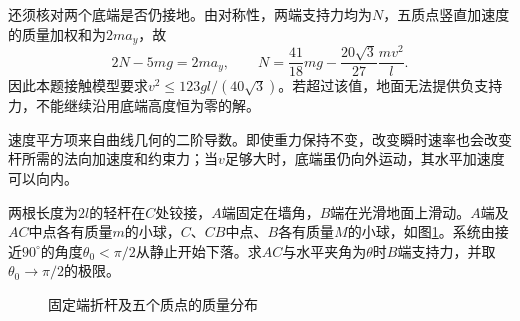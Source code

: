 \begin{solution}
还须核对两个底端是否仍接地。由对称性，两端支持力均为$N$，五质点竖直加速度的质量加权和为$2m a_y$，故
\[
 2N-5mg=2ma_y,\qquad
 N=\frac{41}{18}mg-\frac{20\sqrt3}{27}\frac{mv^2}{l}.
\]
因此本题接触模型要求$v^2\le123gl/(40\sqrt3)$。若超过该值，地面无法提供负支持力，不能继续沿用底端高度恒为零的解。

速度平方项来自曲线几何的二阶导数。即使重力保持不变，改变瞬时速率也会改变杆所需的法向加速度和约束力；当$v$足够大时，底端虽仍向外运动，其水平加速度可以向内。


\end{solution}



\begin{example}[固定端折杆的支承力]\label{ex:hw1-4}

两根长度为$2l$的轻杆在$C$处铰接，$A$端固定在墙角，$B$端在光滑地面上滑动。$A$端及$AC$中点各有质量$m$的小球，$C$、$CB$中点、$B$各有质量$M$的小球，如图\ref{fig:hw1-4-q}。系统由接近$90^\circ$的角度$\theta_0<\pi/2$从静止开始下落。求$AC$与水平夹角为$\theta$时$B$端支持力，并取$\theta_0\to\pi/2$的极限。

\end{example}


\begin{figure}[H]\centering
{}
\caption{固定端折杆及五个质点的质量分布}\label{fig:hw1-4-q}
\end{figure}

